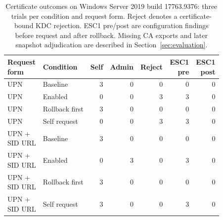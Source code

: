 \begin{table}[tbp]
\centering
\caption{Certificate outcomes on Windows Server 2019 build 17763.9376: three trials per condition and request form. Reject denotes a certificate-bound KDC rejection. ESC1 pre/post are configuration findings before request and after rollback. Missing CA exports and later snapshot adjudication are described in Section~\ref{sec:evaluation}.}
\label{tab:current_patch_policy}
\evidencetable
\begin{tabular}{llrrrrr}
\toprule
\makecell{Request\\form} & Condition & Self & Admin & Reject & \makecell{ESC1\\pre} & \makecell{ESC1\\post} \\
\midrule
UPN & Baseline & 3 & 0 & 0 & 0 & 0 \\
UPN & Enabled & 0 & 0 & 3 & 3 & 0 \\
UPN & Rollback first & 3 & 0 & 0 & 0 & 0 \\
UPN & Self request & 0 & 0 & 3 & 3 & 0 \\
\makecell[l]{UPN +\\SID URL} & Baseline & 3 & 0 & 0 & 0 & 0 \\
\makecell[l]{UPN +\\SID URL} & Enabled & 0 & 3 & 0 & 3 & 0 \\
\makecell[l]{UPN +\\SID URL} & Rollback first & 3 & 0 & 0 & 0 & 0 \\
\makecell[l]{UPN +\\SID URL} & Self request & 3 & 0 & 0 & 3 & 0 \\
\bottomrule
\end{tabular}
\end{table}
